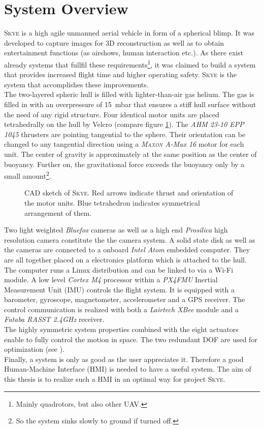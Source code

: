\section{System Overview}
\label{sec:system overview}
\textsc{Skye} is a high agile unmanned aerial vehicle in form of a spherical blimp. It was developed to capture images for 3D reconstruction as well as to obtain entertainment functions (as airshows, human interaction etc.). As there exist already systems that fullfil these requirements\footnote{Mainly quadrotors, but also other UAV.}, it was claimed to build a system that provides increased flight time and higher operating safety. \textsc{Skye} is the system that accomplishes these improvements. \\
The two-layered spheric hull is filled with lighter-than-air gas helium. The gas is filled in with an overpressure of \SI{15}{\milli\bar} that ensures a stiff hull surface without the need of any rigid structure. Four identical motor units are placed tetrahedrally on the hull by Velcro (compare figure \ref{fig:skye_description}). The \textit{AHM 23-10 EPP 1045} thrusters are pointing tangential to the sphere. Their orientation can be changed to any tangential direction using a \textit{\textsc{Maxon} A-Max 16} motor for each unit. The center of gravity is approximately at the same position as the center of buoyancy. Further on, the gravitational force exceeds the buoyancy only by a small amount\footnote{So the system sinks slowly to ground if turned off.}.
\begin{figure}[H]
    \centering
    \def\svgwidth{0.8\columnwidth}
    
    \caption{CAD sketch of \textsc{Skye}. Red arrows indicate thrust and orientation of the motor units. Blue tetrahedron indicates symmetrical arrangement of them. }
    \label{fig:skye_description}
\end{figure}
Two light weighted \textit{Bluefox} cameras as well as a high end \textit{Prosilica} high resolution camera constitute the the camera system. A solid state disk as well as the cameras are connected to a onboard \textit{Intel Atom} embedded computer. They are all together placed on a electronics platform which is attached to the hull. The computer runs a Linux distribution and can be linked to via a Wi-Fi module. A low level \textit{Cortex M4} processor within a \textit{PX4FMU} Inertial Measurement Unit (IMU) controls the flight system. It is equipped with a barometer, gyroscope, magnetometer, accelerometer and a GPS receiver. The control communication is realized with both a \textit{Lairtech XBee} module and a \textit{Futaba RASST 2.4GHz} receiver. \\
The highly symmetric system properties combined with the eight actuators enable to fully control the motion in space. The two redundant DOF are used for optimization (see \cite{schaffnervu}).  \\
Finally, a system is only as good as the user appreciates it. Therefore a good Human-Machine Interface (HMI) is needed to have a useful system. The aim of this thesis is to realize such a HMI in an optimal way for project \textsc{Skye}.
